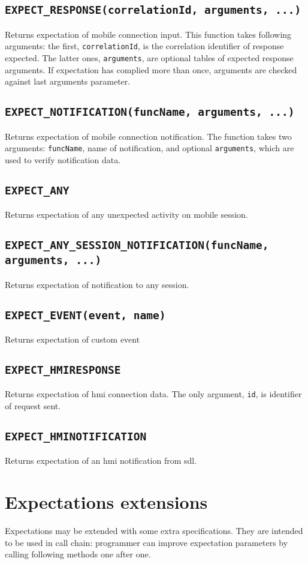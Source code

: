 \documentclass{article}
\begin{document}
\subsection{\tt EXPECT\_RESPONSE(correlationId, arguments, ...)}
Returns expectation of mobile connection input.
This function takes following arguments: the first, {\tt correlationId}, is the
correlation identifier of response expected.
The latter ones, {\tt arguments}, are optional tables of expected response
arguments.
If expectation has complied more than once, arguments are checked against last
arguments parameter.
\subsection{\tt EXPECT\_NOTIFICATION(funcName, arguments, ...)}
Returns expectation of mobile connection notification.
The function takes two arguments: {\tt funcName}, name of notification,
and optional {\tt arguments}, which are used to verify notification data.
\subsection{\tt EXPECT\_ANY}
Returns expectation of any unexpected activity on mobile session.
\subsection{\tt EXPECT\_ANY\_SESSION\_NOTIFICATION(funcName, arguments, ...)}
Returns expectation of notification to any session.
\subsection{\tt EXPECT\_EVENT(event, name)}
Returns expectation of custom event
\subsection{\tt EXPECT\_HMIRESPONSE}
Returns expectation of {\sc hmi} connection data.
The only argument, {\tt id}, is identifier of request sent.
\subsection{\tt EXPECT\_HMINOTIFICATION}
Returns expectation of an {\sc hmi} notification from {\sc sdl}.
\section{Expectations extensions}
Expectations may be extended with some extra specifications.
They are intended to be used in call chain: programmer can improve expectation
parameters by calling following methods one after one.
\end{document}

